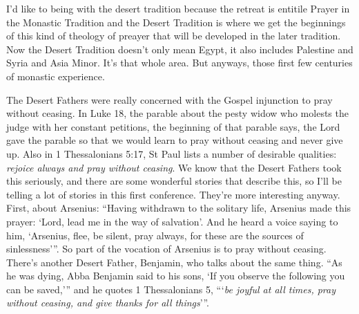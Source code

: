 I'd like to being with  the desert tradition because the retreat is entitile Prayer in the Monastic Tradition and the Desert Tradition is where we get the beginnings of this kind of theology of preayer that will be developed in the later tradition. Now the Desert Tradition doesn't only mean Egypt, it also includes Palestine and Syria and Asia Minor. It's that whole area. But anyways, those first few centuries of monastic experience.

The Desert Fathers were really concerned with the Gospel injunction to pray without ceasing. In Luke 18, the parable about the pesty widow who molests the judge with her constant petitions, the beginning of that parable says, the Lord gave the parable so that we would learn to pray without ceasing and never give up. Also in 1 Thessalonians 5:17, St Paul lists a number of desirable qualities: \emph{rejoice always and pray without ceasing}. We know that the Desert Fathers took this seriously, and there are some wonderful stories that describe this, so I'll be telling a lot of stories in this first conference. They're more interesting anyway. First, about Arsenius: ``Having withdrawn to the solitary life, Arsenius made this prayer: `Lord, lead me in the way of salvation'. And he heard a voice saying to him, `Arsenius, flee, be silent, pray always, for these are the sources of sinlessness'''. So part of the vocation of Arsenius is to pray without ceasing. There's another Desert Father, Benjamin, who talks about the same thing. ``As he was dying, Abba Benjamin said to his sons, `If you observe the following you can be saved,''' and he quotes 1 Thessalonians 5, ```\emph{be joyful at all times, pray without ceasing, and give thanks for all things}'''.

